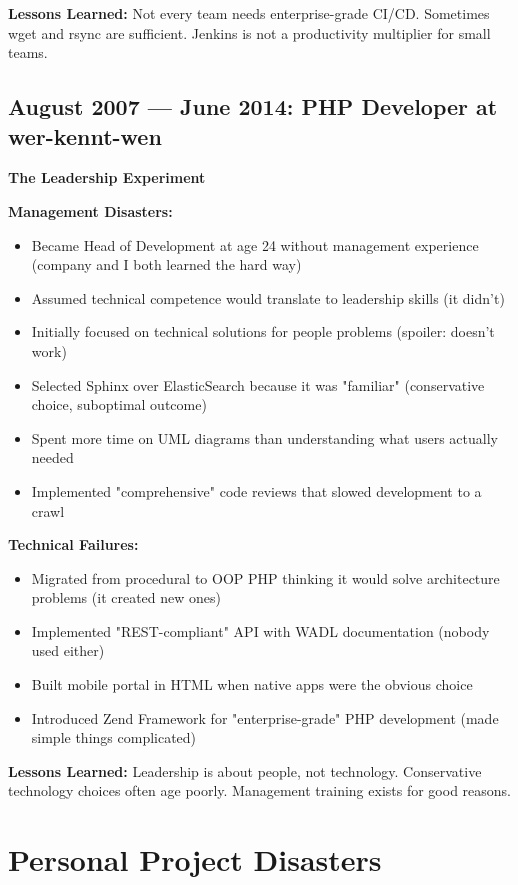 \documentclass[10pt,a4paper]{article}
\begin{document}
\textbf{Lessons Learned:} Not every team needs enterprise-grade CI/CD. Sometimes wget and rsync are sufficient. Jenkins is not a productivity multiplier for small teams.

\subsection{August 2007 — June 2014: PHP Developer at wer-kennt-wen}
\textbf{The Leadership Experiment}

\textbf{Management Disasters:}
\begin{itemize}[leftmargin=*,itemsep=1pt]
    \item Became Head of Development at age 24 without management experience (company and I both learned the hard way)
    \item Assumed technical competence would translate to leadership skills (it didn't)
    \item Initially focused on technical solutions for people problems (spoiler: doesn't work)
    \item Selected Sphinx over ElasticSearch because it was "familiar" (conservative choice, suboptimal outcome)
    \item Spent more time on UML diagrams than understanding what users actually needed
    \item Implemented "comprehensive" code reviews that slowed development to a crawl
\end{itemize}

\textbf{Technical Failures:}
\begin{itemize}[leftmargin=*,itemsep=1pt]
    \item Migrated from procedural to OOP PHP thinking it would solve architecture problems (it created new ones)
    \item Implemented "REST-compliant" API with WADL documentation (nobody used either)
    \item Built mobile portal in HTML when native apps were the obvious choice
    \item Introduced Zend Framework for "enterprise-grade" PHP development (made simple things complicated)
\end{itemize}

\textbf{Lessons Learned:} Leadership is about people, not technology. Conservative technology choices often age poorly. Management training exists for good reasons.

\section{Personal Project Disasters}
\end{document}
